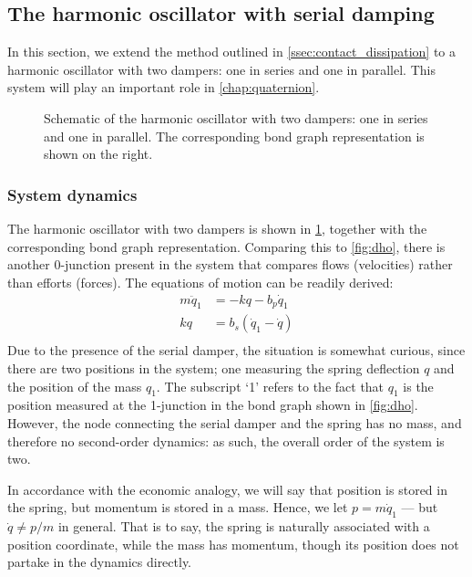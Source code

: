 \subsection{The harmonic oscillator with serial damping}
\label{ssec:serial_damping}
In this section, we extend the method outlined in \cref{ssec:contact_dissipation} to a harmonic oscillator with two dampers: one in series and one in parallel. This system will play an important role in \cref{chap:quaternion}.
\begin{figure}[ht!]
    \centering
    
    \caption{Schematic of the harmonic oscillator with two dampers: one in series and one in parallel. The corresponding bond graph representation is shown on the right.}
    \label{fig:double_damped_osc}
\end{figure}

\subsubsection{System dynamics}
The harmonic oscillator with two dampers is shown in \cref{fig:double_damped_osc}, together with the corresponding bond graph representation. Comparing this to \cref{fig:dho}, there is another 0-junction present in the system that compares flows (velocities) rather than efforts (forces). The equations of motion can be readily derived:
\begin{equation}
    \begin{split}
        m\ddot{q}_1 &= -kq - b_p \dot{q}_1 \\
        kq &= b_s(\dot{q}_1 - \dot{q}) \\
    \end{split}
    \label{eq:serial_eom_raw}
\end{equation}
Due to the presence of the serial damper, the situation is somewhat curious, since there are two positions in the system; one measuring the spring deflection \(q\) and the position of the mass \(q_1\). The subscript `1' refers to the fact that \(q_1\) is the position measured at the 1-junction in the bond graph shown in \cref{fig:dho}. However, the node connecting the serial damper and the spring has no mass, and therefore no second-order dynamics: as such, the overall order of the system is two. 

In accordance with the economic analogy, we will say that position is stored in the spring, but momentum is stored in a mass.
Hence, we let \(p = m\dot{q}_1\) --- but \(\dot{q} \neq p/m\) in general. That is to say, the spring is naturally associated with a position coordinate, while the mass has momentum, though its position does not partake in the dynamics directly.

